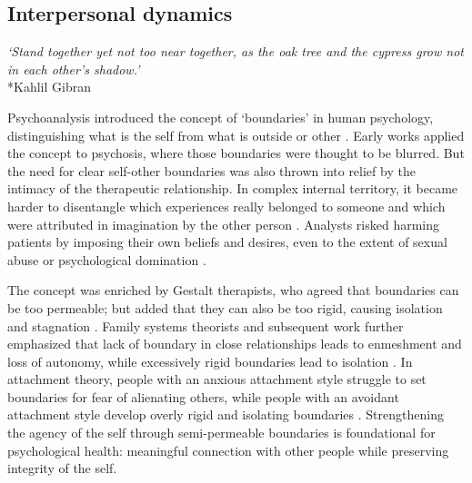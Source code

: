 \documentclass[12pt]{article}
\begin{document}
\subsection{Interpersonal dynamics}

\begin{center}
\textit{`Stand together yet not too near together, as the oak tree and the cypress grow not in each other's shadow.'}\\*Kahlil Gibran
\end{center}


Psychoanalysis introduced the concept of `boundaries' in human psychology, distinguishing what is the self from what is outside or other \citep{federn1928narcissism, tausk1919entstehung}. Early works applied the concept to psychosis, where those boundaries were thought to be blurred. But the need for clear self-other boundaries was also thrown into relief by the intimacy of the therapeutic relationship. In complex internal territory, it became harder to disentangle which experiences really belonged to someone and which were attributed in imagination by the other person \citep{freud1894neuro, freud1910future}. Analysts risked harming patients by imposing their own beliefs and desires, even to the extent of sexual abuse or psychological domination \citep{gabbard1995boundaries}. 

The concept was enriched by Gestalt therapists, who agreed that boundaries can be too permeable; but added that they can also be too rigid, causing isolation and stagnation \citep{perls1951gestalt, polster1974gestalt, yontef1993awareness}. Family systems theorists and subsequent work further emphasized that lack of boundary in close relationships leads to enmeshment and loss of autonomy, while excessively rigid boundaries lead to isolation \citep{minuchin1974families, bowen1978family, cloud1992boundaries, brown2012daring}. In attachment theory, people with an anxious attachment style struggle to set boundaries for fear of alienating others, while people with an avoidant attachment style develop overly rigid and isolating boundaries \citep{ainsworth1978patterns}. Strengthening the agency of the self through semi-permeable boundaries is foundational for psychological health: meaningful connection with other people while preserving integrity of the self. 
\end{document}
